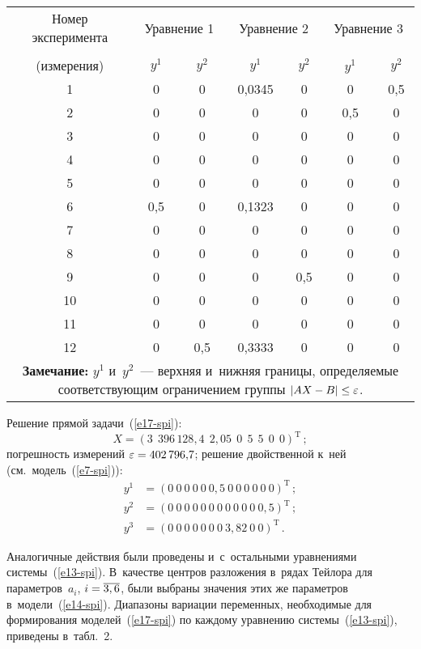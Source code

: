\begin{multicols}{2}
\begin{table*}
\begin{center}
\begin{tabular}{|c|c|c|c|c|c|c|}
\hline
Номер эксперимента &\multicolumn{2}{c|}{Уравнение
1}&\multicolumn{2}{c|}{Уравнение 2}&\multicolumn{2}{c|}{Уравнение 3}\\
\cline{2-7}
&&&&&&\\[-10pt]
(измерения)&$y^1$&$y^2$&$y^1$&$y^2$&\ \ $y^1$\ \ &$y^2$\\
\hline
1&0&0&0,0345&0&0&0,5\\
2&0&0&0&0&0,5&0\\
3&0&0&0&0&0&0\\
4&0&0&0&0&0&0\\
5&0&0&0&0&0&0\\
6&0,5&0&0,1323&0&0&0\\
7&0&0&0&0&0&0\\
8&0&0&0&0&0&0\\
9&0&0&0&0,5&0&0\\
10\hphantom{9}&0&0&0&0&0&0\\
11\hphantom{9}&0&0&0&0&0&0\\
12\hphantom{9}&0&0,5&0,3333&0&0&0\\
\hline
\multicolumn{7}{p{96mm}}{\footnotesize \hspace*{3mm}\textbf{Замечание:}
$y^1$ и~$y^2$~--- верхняя и~нижняя границы,
определяемые соответ\-ст\-ву\-ющим ограничением группы  $\vert AX\hm- B\vert \hm\leq \varepsilon$.}
\end{tabular}
\end{center}
\vspace*{-6pt}
\end{table*}

  Решение прямой задачи~(\ref{e17-spi}):
  $$
  X=\left( 3 \ \ 396\,128{,}4\ \ 2{,}05\ \ 0 \ \ 5\ \ 5\ \ 0\ \ 0\right)^{\mathrm{T}}\,;
  $$
  погрешность измерений $\varepsilon\hm=402\,796{,}7$; решение
двойственной к~ней (см.\ модель~(\ref{e7-spi})):
  \begin{align*}
  y^1 &= \left( 0\  0 \ 0 \ 0 \ 0 \ 0{,}5  \ 0\ 0\ 0\ 0\ 0\ 0\right)^{\mathrm{T}}\,;\\
  y^2 &= \left( 0\ 0\ 0\ 0\ 0\ 0\ 0\ 0\ 0\ 0\ 0\ 0{,}5\right)^{\mathrm{T}}\,;\\
  y^3 &=\left( 0\ 0\ 0\ 0\ 0\ 0\ 0\ 3{,}82\ 0\ 0\right)^{\mathrm{T}}\,.
  \end{align*}

  Аналогичные действия были проведены и~с~остальными уравнениями
системы~(\ref{e13-spi}). В~качестве центров разложения в~рядах Тейлора для
параметров~$a_i$, $i\hm= \overline{3,6}$, были выбраны значения этих же
параметров в~модели~(\ref{e14-spi}). Диапазоны вариации переменных,
необходимые для формирования моделей~(\ref{e17-spi}) по каждому
уравнению системы~(\ref{e13-spi}), приведены в~табл.~2.




\end{multicols}
